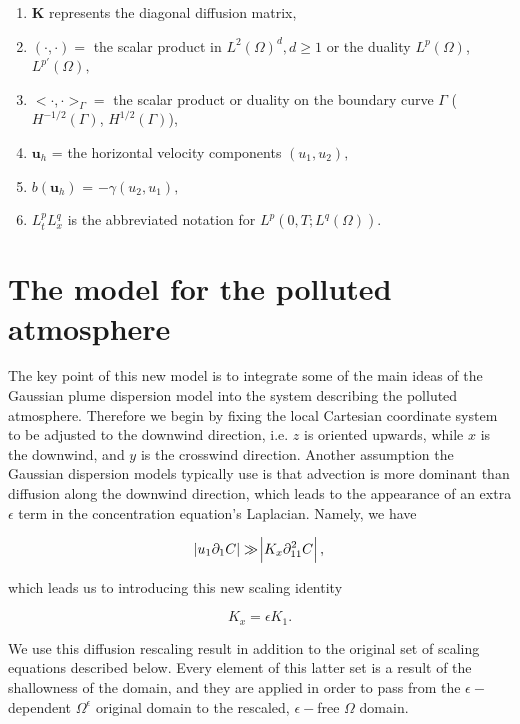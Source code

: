 \documentclass[11pt]{article}
\begin{document}
\begin{enumerate}
\item $\mathbf{K}$ represents the diagonal diffusion matrix,
\item $( \cdot,\cdot) = $ the scalar product in $L^2(\Omega)^d, d \geq 1$ or the duality $L^p (\Omega)$, $L^{p'} (\Omega),$
\item $< \cdot,\cdot>_{\Gamma} = $ the scalar product or duality on the boundary curve $\Gamma$ ($H^{-1/2}(\Gamma)$, $H^{1/2}(\Gamma)$),
\item $\mathbf{u}_h$ = the horizontal velocity components $(u_1, u_2),$
\item $b(\mathbf{u}_h)$ = $- \gamma (u_2 , u_1),$
\item $L^p_t L^q_x$ is the abbreviated notation for $L^p (0, T; L^q(\Omega)).$

\end{enumerate}

\section{The model for the polluted atmosphere} \label{eqsdescribingatmpluspollution}

The key point of this new model is to integrate some of the main ideas of the Gaussian plume dispersion model into the system describing the polluted atmosphere. Therefore we begin by fixing the local Cartesian coordinate system to be adjusted to the downwind direction, i.e. $z$ is oriented upwards, while $x$ is the downwind, and $y$ is the crosswind direction. Another assumption the Gaussian dispersion models typically use is that advection is more dominant than diffusion along the downwind direction, which leads to the appearance of an extra $\epsilon$ term in the concentration equation's Laplacian. Namely, we have

\begin{equation} \abs{u_1 \partial_{1} C} \gg \abs{ K_x \partial_{11} ^2 C },\end{equation}

which leads us to introducing this new scaling identity

\begin{equation} \label{ksepsk1} K_x = \epsilon K_1. \end{equation}

We use this diffusion rescaling result in addition to the original set of scaling equations described below. Every element of this latter set is a result of the shallowness of the domain, and they are applied in order to pass from the $\epsilon-$ dependent $\Omega^\epsilon$ original domain to the rescaled, $\epsilon-$free $\Omega$ domain.
\end{document}
